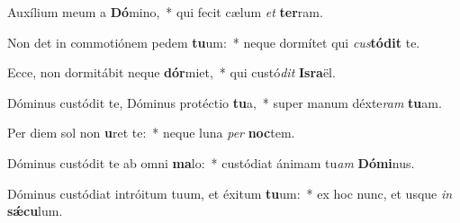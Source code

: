 \item Auxílium meum a \textbf{Dó}mino,~* qui fecit cælum \textit{et} \textbf{ter}ram.
\item Non det in commotiónem pedem \textbf{tu}um:~* neque dormítet qui \textit{cus}\textbf{tó}\textbf{dit} te.
\item Ecce, non dormitábit neque \textbf{dór}miet,~* qui custó\textit{dit} \textbf{Is}\textbf{ra}ël.
\item Dóminus custódit te, Dóminus protéctio \textbf{tu}a,~* super manum déxte\textit{ram} \textbf{tu}am.
\item Per diem sol non \textbf{u}ret te:~* neque luna \textit{per} \textbf{noc}tem.
\item Dóminus custódit te ab omni \textbf{ma}lo:~* custódiat ánimam tu\textit{am} \textbf{Dó}\textbf{mi}nus.
\item Dóminus custódiat intróitum tuum, et éxitum \textbf{tu}um:~* ex hoc nunc, et usque \textit{in} \textbf{sǽ}\textbf{cu}lum.
